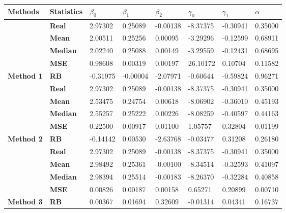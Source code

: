 \begin{table}
\centering
\begin{tabular}[t]{>{}l>{}lllllll}
\toprule
Methods & Statistics & $\beta_0$ & $\beta_1$ & $\beta_2$ & $\gamma_0$ & $\gamma_1$ & $\alpha$\\
\midrule
 & \textbf{Real} & 2.97302 & 0.25089 & -0.00138 & -8.37375 & -0.30941 & 0.35000\\
\cmidrule{2-8}
 & \textbf{Mean} & 2.00511 & 0.25256 & 0.00095 & -3.29296 & -0.12599 & 0.68911\\
\cmidrule{2-8}
 & \textbf{Median} & 2.02240 & 0.25088 & 0.00149 & -3.29559 & -0.12431 & 0.68695\\
\cmidrule{2-8}
 & \textbf{MSE} & 0.98608 & 0.00319 & 0.00197 & 26.10172 & 0.10704 & 0.11582\\
\cmidrule{2-8}
\multirow{-5}{*}{\raggedright\arraybackslash \textbf{Method 1}} & \textbf{RB} & -0.31975 & -0.00004 & -2.07971 & -0.60644 & -0.59824 & 0.96271\\
\cmidrule{1-8}
 & \textbf{Real} & 2.97302 & 0.25089 & -0.00138 & -8.37375 & -0.30941 & 0.35000\\
\cmidrule{2-8}
 & \textbf{Mean} & 2.53475 & 0.24754 & 0.00618 & -8.06902 & -0.36010 & 0.45193\\
\cmidrule{2-8}
 & \textbf{Median} & 2.55257 & 0.25222 & 0.00226 & -8.08259 & -0.40597 & 0.44163\\
\cmidrule{2-8}
 & \textbf{MSE} & 0.22500 & 0.00917 & 0.01100 & 1.05757 & 0.32804 & 0.01199\\
\cmidrule{2-8}
\multirow{-5}{*}{\raggedright\arraybackslash \textbf{Method 2}} & \textbf{RB} & -0.14142 & 0.00530 & -2.63768 & -0.03477 & 0.31208 & 0.26180\\
\cmidrule{1-8}
 & \textbf{Real} & 2.97302 & 0.25089 & -0.00138 & -8.37375 & -0.30941 & 0.35000\\
\cmidrule{2-8}
 & \textbf{Mean} & 2.98492 & 0.25361 & -0.00100 & -8.34514 & -0.32593 & 0.41097\\
\cmidrule{2-8}
 & \textbf{Median} & 2.98394 & 0.25514 & -0.00183 & -8.26370 & -0.32284 & 0.40858\\
\cmidrule{2-8}
 & \textbf{MSE} & 0.00826 & 0.00187 & 0.00158 & 0.65271 & 0.20899 & 0.00710\\
\cmidrule{2-8}
\multirow{-5}{*}{\raggedright\arraybackslash \textbf{Method 3}} & \textbf{RB} & 0.00367 & 0.01694 & 0.32609 & -0.01314 & 0.04341 & 0.16737\\
\bottomrule
\end{tabular}
\end{table}
